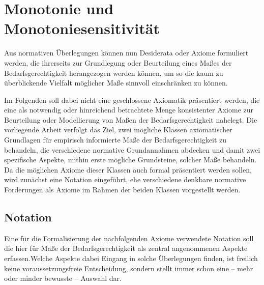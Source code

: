 \documentclass[a4paper]{thesis}
\begin{document}
\section{Monotonie und Monotoniesensitivität}
\lettrine{A}{}\thickspace us normativen Überlegungen können nun Desiderata oder Axiome formuliert werden, die ihrerseits zur Grundlegung oder Beurteilung eines Maßes der Bedarfsgerechtigkeit herangezogen werden können, um so die kaum zu überblickende Vielfalt möglicher Maße sinnvoll einschränken zu können.

Im Folgenden soll dabei nicht eine geschlossene Axiomatik präsentiert werden, die eine als notwendig oder hinreichend betrachtete Menge konsistenter Axiome zur Beurteilung oder Modellierung von Maßen der Bedarfsgerechtigkeit nahelegt. Die vorliegende Arbeit verfolgt das Ziel, zwei mögliche Klassen axiomatischer Grundlagen für empirisch informierte Maße der Bedarfsgerechtigkeit zu behandeln, die verschiedene normative Grundannahmen abdecken und damit zwei spezifische Aspekte, mithin erste mögliche Grundsteine, solcher Maße behandeln. Da die möglichen Axiome dieser Klassen auch formal präsentiert werden sollen, wird zunächst eine Notation eingeführt, ehe verschiedene denkbare normative Forderungen als Axiome im Rahmen der beiden Klassen vorgestellt werden.

\subsection{Notation}
Eine für die Formalisierung der nachfolgenden Axiome verwendete Notation soll die hier für Maße der Bedarfsgerechtigkeit als zentral angenommenen Aspekte erfassen.Welche Aspekte dabei Eingang in solche Überlegungen finden, ist freilich keine voraussetzungsfreie Entscheidung, sondern stellt immer schon eine -- mehr oder minder bewusste -- Auswahl dar.
\end{document}
